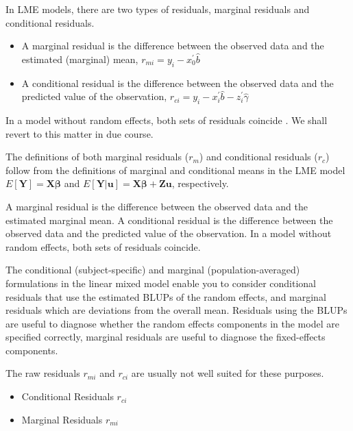 \documentclass[12pt, a4paper]{report}
\theoremstyle{plain}
\theoremstyle{definition}
\theoremstyle{remark}
\begin{document}
In LME models, there are two types of residuals, marginal residuals and conditional residuals. 
	
	\begin{itemize}
		\item A marginal residual is the difference between the observed data and the estimated (marginal) mean, $r_{mi} = y_i - x_0^{\prime} \hat{b}$
		\item A conditional residual is the difference between the observed data and the predicted value of the observation,
		$r_{ci} = y_i - x_i^{\prime} \hat{b} - z_i^{\prime} \hat{\gamma}$	
	\end{itemize} 
	In a model without random effects, both sets of
	residuals coincide \citep{schabenberger}. We shall revert to this matter in due course.
	
The definitions of both marginal residuals ($r_m$) and conditional residuals ($r_c$) follow from the definitions of marginal and conditional means in the LME model 
	$E[\boldsymbol{Y}] = \boldsymbol{X}\boldsymbol{\beta}$ and $E[\boldsymbol{Y|\boldsymbol{u}}] = \boldsymbol{X}\boldsymbol{\beta} + \boldsymbol{Z}\boldsymbol{u}$, respectively.
	
A marginal residual is the difference between the observed data and the estimated marginal mean. A conditional residual is the difference between the observed data and the predicted value of the observation. In a model without random effects, both sets of residuals coincide.
	
The conditional (subject-specific) and marginal (population-averaged) formulations in the linear mixed model enable you to consider conditional residuals that use the estimated BLUPs of the random effects, and marginal residuals which are deviations from the overall mean. Residuals using the BLUPs are useful to diagnose whether the random effects components in the model are specified correctly, marginal residuals are useful to diagnose the fixed-effects components.	
	
The raw residuals $r_{mi}$ and $r_{ci}$ are usually not well suited for these purposes.
	
	\begin{itemize}
		\item Conditional Residuals $r_{ci}$
		\item Marginal Residuals $r_{mi}$
	\end{itemize}
	
\end{document}

